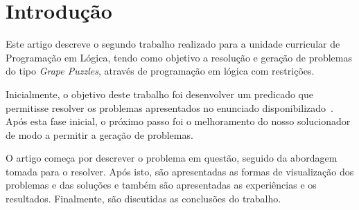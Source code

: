 \section{Introdução}
Este artigo descreve o segundo trabalho realizado para a unidade curricular de Programação em Lógica, tendo como objetivo a resolução e geração de problemas do tipo \textit{Grape Puzzles}, através de programação em lógica com restrições.

Inicialmente, o objetivo deste trabalho foi desenvolver um predicado que permitisse resolver os problemas apresentados no enunciado disponibilizado~\cite{ref_url1}. Após esta fase inicial, o próximo passo foi o melhoramento do nosso solucionador de modo a permitir a geração de problemas.

O artigo começa por descrever o problema em questão, seguido da abordagem tomada para o resolver. Após isto, são apresentadas as formas de visualização dos problemas e das soluções e também são apresentadas as experiências e os resultados. Finalmente, são discutidas as conclusões do trabalho.